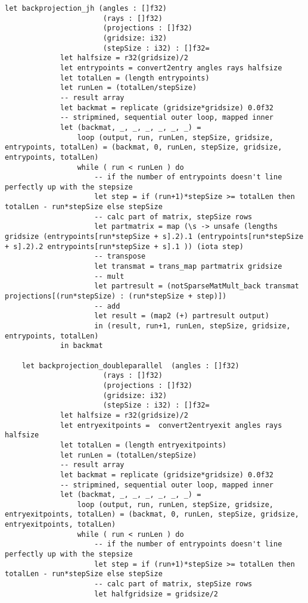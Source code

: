 \begin{lstlisting}[language=Futhark]
    let backprojection_jh (angles : []f32)
                       (rays : []f32)
                       (projections : []f32)
                       (gridsize: i32)
                       (stepSize : i32) : []f32=
             let halfsize = r32(gridsize)/2
             let entrypoints = convert2entry angles rays halfsize
             let totalLen = (length entrypoints)
             let runLen = (totalLen/stepSize)
             -- result array
             let backmat = replicate (gridsize*gridsize) 0.0f32
             -- stripmined, sequential outer loop, mapped inner
             let (backmat, _, _, _, _, _, _) =
                 loop (output, run, runLen, stepSize, gridsize, entrypoints, totalLen) = (backmat, 0, runLen, stepSize, gridsize, entrypoints, totalLen)
                 while ( run < runLen ) do
                     -- if the number of entrypoints doesn't line perfectly up with the stepsize
                     let step = if (run+1)*stepSize >= totalLen then totalLen - run*stepSize else stepSize
                     -- calc part of matrix, stepSize rows
                     let partmatrix = map (\s -> unsafe (lengths gridsize (entrypoints[run*stepSize + s].2).1 (entrypoints[run*stepSize + s].2).2 entrypoints[run*stepSize + s].1 )) (iota step)
                     -- transpose
                     let transmat = trans_map partmatrix gridsize
                     -- mult
                     let partresult = (notSparseMatMult_back transmat projections[(run*stepSize) : (run*stepSize + step)])
                     -- add
                     let result = (map2 (+) partresult output)
                     in (result, run+1, runLen, stepSize, gridsize, entrypoints, totalLen)
             in backmat

    let backprojection_doubleparallel  (angles : []f32)
                       (rays : []f32)
                       (projections : []f32)
                       (gridsize: i32)
                       (stepSize : i32) : []f32=
             let halfsize = r32(gridsize)/2
             let entryexitpoints =  convert2entryexit angles rays halfsize
             let totalLen = (length entryexitpoints)
             let runLen = (totalLen/stepSize)
             -- result array
             let backmat = replicate (gridsize*gridsize) 0.0f32
             -- stripmined, sequential outer loop, mapped inner
             let (backmat, _, _, _, _, _, _) =
                 loop (output, run, runLen, stepSize, gridsize, entryexitpoints, totalLen) = (backmat, 0, runLen, stepSize, gridsize, entryexitpoints, totalLen)
                 while ( run < runLen ) do
                     -- if the number of entrypoints doesn't line perfectly up with the stepsize
                     let step = if (run+1)*stepSize >= totalLen then totalLen - run*stepSize else stepSize
                     -- calc part of matrix, stepSize rows
                     let halfgridsize = gridsize/2


\end{lstlisting}

